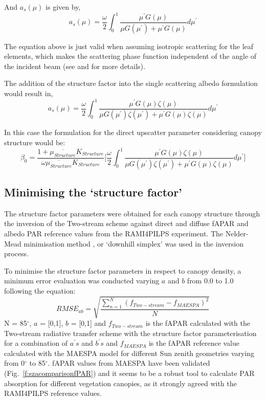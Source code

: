 \documentclass[a4paper,11pt]{report}
\begin{document}
And $a_s(\mu)$ is given by, 
\begin{equation}
a_s(\mu) = \frac{\omega}{2}\int_{0}^{1} \frac{\mu^\prime G(\mu)}{\mu G(\mu^\prime) + \mu^\prime G(\mu)} d\mu^\prime
\label{equation:alphas}
\end{equation}

The equation above is just valid when assuming isotropic scattering for the leaf elements, which makes the scattering phase function independent of the angle of the incident beam (see \citet{Dickinson1983} and \citet{Sellers1985} for more details). 

The addition of the structure factor into the single scattering albedo formulation would result in,
\begin{equation}
a_s(\mu) = \frac{\omega}{2}\int_{0}^{1} \frac{\mu^\prime G(\mu) \zeta(\mu)}{\mu G(\mu^\prime) \zeta(\mu^\prime) + \mu^\prime G(\mu)\zeta(\mu)} d\mu^\prime
\label{equation:alphasstruct}
\end{equation}

In this case the formulation for the direct upscatter parameter considering canopy structure would be: 
\begin{equation}
\beta_0 = \frac{1 + \overline{\mu_{Structure}}K_{Structure}}{\omega\overline{\mu_{Structure}}K_{Structure}}
\bigg[\frac{\omega}{2}\int_{0}^{1} \frac{\mu^\prime G(\mu) \zeta(\mu)}{\mu G(\mu^\prime) \zeta(\mu^\prime) + \mu^\prime G(\mu)\zeta(\mu)} d\mu^\prime \bigg]
\label{equation:alphasstruct}
\end{equation}

\subsection{Minimising the `structure factor'}\label{sub:minimise}
The structure factor parameters were obtained for each canopy structure through the inversion of the Two-stream scheme against direct and diffuse fAPAR and albedo PAR reference values from the RAMI4PILPS experiment. The Nelder-Mead minimisation method \citep{Nelder1964}, or `downhill simplex' was used in the inversion process. 

To minimise the structure factor parameters in respect to canopy density, a minimum error evaluation was conducted varying $a$ and $b$ from 0.0 to 1.0 following the equation:
\begin{equation}
RMSE_{ab} = \sqrt{\frac{\sum_{n=1}^{N} (f_{Two-stream} - f_{MAESPA})^2}{N}}
\label{equation:rmseab}
\end{equation}
\noindent N = 85$^{\circ}$, $a$ = [0,1], $b$ = [0,1] and $f_{Two-stream}$ is the fAPAR calculated with the Two-stream radiative transfer scheme with the structure factor parameterisation for a combination of $a^{\prime}s$ and $b^{\prime}s$ and  $f_{MAESPA}$ is the fAPAR reference value calculated with the MAESPA model for different Sun zenith geometries varying from 0$^{\circ}$ to 85$^{\circ}$. fAPAR values from MAESPA have been validated (Fig.~\ref{f:szacomparisonfPAR}) and it seems to be a robust tool to calculate PAR absorption for different vegetation canopies, as it strongly agreed with the RAMI4PILPS reference values. 
\end{document}
